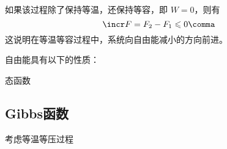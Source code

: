     如果该过程除了保持等温，还保持等容，即 $W = 0$，则有%
    \begin{equation}
      \incr F = F_2 - F_1 \leqslant 0 \comma
    \end{equation}
    这说明在等温等容过程中，系统向自由能减小的方向前进。
    
    自由能具有以下的性质：
    \begin{myEnum2}
      \item 态函数 %
    \end{myEnum2}
  \subsection{Gibbs函数}
    考虑等温等压过程